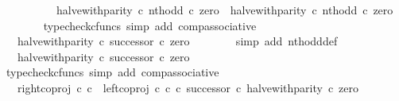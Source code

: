 \begin{isabellebody}
\ \ \isamarkupfalse%
\ {\isacharminus}{\kern0pt}\isanewline
\ \ \ \ \isamarkupfalse%
\ {\isachardoublequoteopen}{\isacharparenleft}{\kern0pt}halve{\isacharunderscore}{\kern0pt}with{\isacharunderscore}{\kern0pt}parity\ {\isasymcirc}\isactrlsub c\ nth{\isacharunderscore}{\kern0pt}odd{\isacharparenright}{\kern0pt}\ {\isasymcirc}\isactrlsub c\ zero\ {\isacharequal}{\kern0pt}\ halve{\isacharunderscore}{\kern0pt}with{\isacharunderscore}{\kern0pt}parity\ {\isasymcirc}\isactrlsub c\ nth{\isacharunderscore}{\kern0pt}odd\ {\isasymcirc}\isactrlsub c\ zero{\isachardoublequoteclose}\isanewline
\ \ \ \ \ \ \isamarkupfalse%
\ {\isacharparenleft}{\kern0pt}typecheck{\isacharunderscore}{\kern0pt}cfuncs{\isacharcomma}{\kern0pt}\ simp\ add{\isacharcolon}{\kern0pt}\ comp{\isacharunderscore}{\kern0pt}associative{}{\isacharparenright}{\kern0pt}\isanewline
\ \ \ \ \isamarkupfalse%
\ \isamarkupfalse%
\ {\isachardoublequoteopen}{\isachardot}{\kern0pt}{\isachardot}{\kern0pt}{\isachardot}{\kern0pt}\ {\isacharequal}{\kern0pt}\ halve{\isacharunderscore}{\kern0pt}with{\isacharunderscore}{\kern0pt}parity\ {\isasymcirc}\isactrlsub c\ successor\ {\isasymcirc}\isactrlsub c\ zero{\isachardoublequoteclose}\isanewline
\ \ \ \ \ \ \isamarkupfalse%
\ {\isacharparenleft}{\kern0pt}simp\ add{\isacharcolon}{\kern0pt}\ nth{\isacharunderscore}{\kern0pt}odd{\isacharunderscore}{\kern0pt}def{}{\isacharparenright}{\kern0pt}\isanewline
\ \ \ \ \isamarkupfalse%
\ \isamarkupfalse%
\ {\isachardoublequoteopen}{\isachardot}{\kern0pt}{\isachardot}{\kern0pt}{\isachardot}{\kern0pt}\ {\isacharequal}{\kern0pt}\ {\isacharparenleft}{\kern0pt}halve{\isacharunderscore}{\kern0pt}with{\isacharunderscore}{\kern0pt}parity\ {\isasymcirc}\isactrlsub c\ successor{\isacharparenright}{\kern0pt}\ {\isasymcirc}\isactrlsub c\ zero{\isachardoublequoteclose}\isanewline
\ \ \ \ \ \ \isamarkupfalse%
\ {\isacharparenleft}{\kern0pt}typecheck{\isacharunderscore}{\kern0pt}cfuncs{\isacharcomma}{\kern0pt}\ simp\ add{\isacharcolon}{\kern0pt}\ comp{\isacharunderscore}{\kern0pt}associative{}{\isacharparenright}{\kern0pt}\isanewline
\ \ \ \ \isamarkupfalse%
\ \isamarkupfalse%
\ {\isachardoublequoteopen}{\isachardot}{\kern0pt}{\isachardot}{\kern0pt}{\isachardot}{\kern0pt}\ {\isacharequal}{\kern0pt}\ {\isacharparenleft}{\kern0pt}right{\isacharunderscore}{\kern0pt}coproj\ {\isasymnat}\isactrlsub c\ {\isasymnat}\isactrlsub c\ {\isasymamalg}\ {\isacharparenleft}{\kern0pt}left{\isacharunderscore}{\kern0pt}coproj\ {\isasymnat}\isactrlsub c\ {\isasymnat}\isactrlsub c\ {\isasymcirc}\isactrlsub c\ successor{\isacharparenright}{\kern0pt}\ {\isasymcirc}\isactrlsub c\ halve{\isacharunderscore}{\kern0pt}with{\isacharunderscore}{\kern0pt}parity{\isacharparenright}{\kern0pt}\ {\isasymcirc}\isactrlsub c\ zero{\isachardoublequoteclose}\isanewline

\end{isabellebody}
